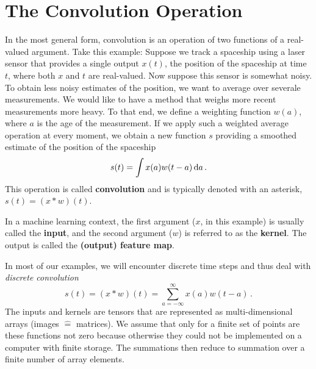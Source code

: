 \section{The Convolution Operation}
In the most general form, convolution is an operation of two functions
of a real-valued argument. Take this example: Suppose we track a
spaceship using a laser sensor that provides a single output $x(t)$,
the position of the spaceship at time $t$, where both $x$ and $t$ are
real-valued. Now suppose this sensor is somewhat noisy. To obtain less
noisy estimates of the position, we want to average over severale
measurements. We would like to have a method that weighs more recent
measurements more heavy. To that end, we define a weighting function
$w(a)$, where $a$ is the age of the measurement. If we apply such a
weighted average operation at every moment, we obtain a new function
$s$ providing a smoothed estimate of the position of the spaceship
\begin{equation*}
  s(t) = \int x(a)w(t-a) \,\mathrm{d}a\,.
\end{equation*}
This operation is called \textbf{convolution} and is typically denoted
with an asterisk, \ie $s(t) = (x \ast w)(t)$.

In a machine learning context, the first argument ($x$, in this
example) is usually called the \textbf{input}, and the second argument
($w$) is referred to as the \textbf{kernel}. The output is called the
\textbf{(output) feature map}.

In most of our examples, we will encounter discrete time steps and
thus deal with \emph{discrete convolution}
\begin{equation*}
  s(t) = (x \ast w)(t) = \sum_{a = -\infty}^\infty x(a) w(t - a)\,.
\end{equation*}
The inputs and kernels are tensors that are represented as
multi-dimensional arrays (\eg images $\hat=$ matrices). We assume that
only for a finite set of points are these functions not zero because
otherwise they could not be implemented on a computer with finite
storage. The summations then reduce to summation over a finite number
of array elements.

